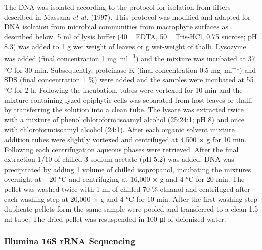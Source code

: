 \documentclass[12pt,]{article}
\begin{document}
The DNA was isolated according to the protocol for isolation from
filters described in Massana \emph{et al.} (1997). This protocol was
modified and adapted for DNA isolation from microbial communities from
macrophyte surfaces as described below. 5 \si{\ml} of lysis buffer (40
\si{\milli\Molar} EDTA, 50 \si{\milli\Molar} Tris-HCl, 0.75 \si{\Molar}
sucrose; pH 8.3) was added to 1 \si{\g} wet weight of leaves or \si{\g}
wet-weight of thalli. Lysozyme was added (final concentration 1
\si{\mg\per\ml}) and the mixture was incubated at 37 \si{\degreeCelsius}
for 30 \si{\minute}. Subsequently, proteinase K (final concentration 0.5
\si{\mg\per\ml}) and SDS (final concentration 1 \si{\percent}) were
added and the samples were incubated at 55 \si{\degreeCelsius} for 2
\si{\hour}. Following the incubation, tubes were vortexed for 10
\si{\minute} and the mixture containing lyzed epiphytic cells was
separated from host leaves or thalli by transferring the solution into a
clean tube. The lysate was extracted twice with a mixture of
phenol:chloroform:isoamyl alcohol (25:24:1; pH 8) and once with
chloroform:isoamyl alcohol (24:1). After each organic solvent mixture
addition tubes were slightly vortexed and centrifuged at 4,500 × g for
10 \si{\minute}. Following each centrifugation aqueous phases were
retrieved. After the final extraction 1/10 of chilled 3 \si{\Molar}
sodium acetate (pH 5.2) was added. DNA was precipitated by adding 1
volume of chilled isopropanol, incubating the mixtures overnight at
\num{-20} °C and centrifuging at 16,000 × g and 4 \si{\degreeCelsius}
for 20 \si{\minute}. The pellet was washed twice with 1 \si{\ml} of
chilled 70 \si{\percent} ethanol and centrifuged after each washing step
at 20,000 × g and 4 \si{\degreeCelsius} for 10 \si{\minute}. After the
first washing step duplicate pellets form the same sample were pooled
and transferred to a clean 1.5 \si{\ml} tube. The dried pellet was
resuspended in 100 \si{\ul} of deionized water.

\subsubsection{Illumina 16S rRNA
Sequencing}\label{illumina-16s-rrna-sequencing}
\end{document}
